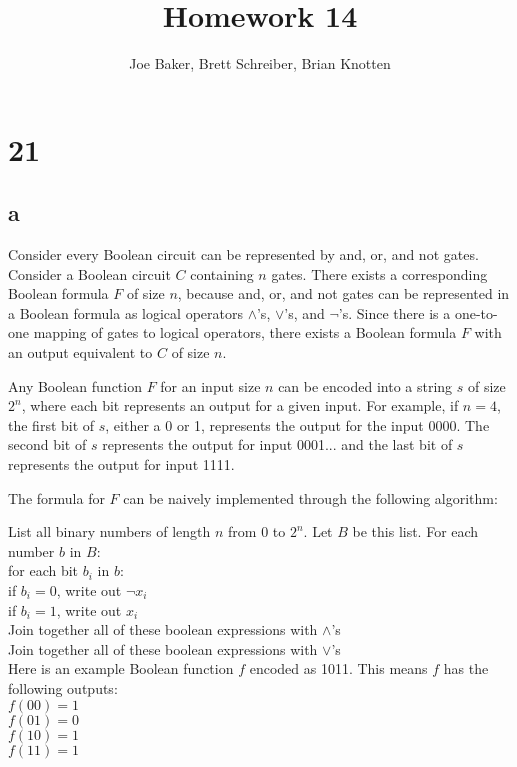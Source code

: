 \documentclass[letterpaper,notitlepage,twoside]{article}
\newcommand\tab[1][1cm]{\hspace*{#1}} %
\begin{document}
\title{Homework 14}
\author{Joe Baker, Brett Schreiber, Brian Knotten}
\maketitle

\section*{21}

\subsection*{a}
Consider every Boolean circuit can be represented by and, or, and not gates. \\
Consider a Boolean circuit $C$ containing $n$ gates. There exists a corresponding Boolean formula $F$ of size $n$, because and, or, and not gates can be represented in a Boolean formula as logical operators $\land$'s, $\lor$'s, and $\neg$'s. Since there is a one-to-one mapping of gates to logical operators, there exists a Boolean formula $F$ with an output equivalent to $C$ of size $n$.

Any Boolean function $F$ for an input size $n$ can be encoded into a string $s$ of size $2^n$, where each bit represents an output for a given input. For example, if $n = 4$, the first bit of $s$, either a 0 or 1, represents the output for the input 0000. The second bit of $s$ represents the output for input 0001... and the last bit of $s$ represents the output for input 1111.

The formula for $F$ can be naively implemented through the following algorithm:

List all binary numbers of length $n$ from $0$ to $2^n$. Let $B$ be this list.
For each number $b$ in $B$: \\
\tab for each bit $b_i$ in $b$: \\
\tab\tab if $b_i = 0$, write out $\neg x_i$ \\
\tab\tab if $b_i = 1$, write out $x_i$ \\
\tab Join together all of these boolean expressions with $\land$'s \\
Join together all of these boolean expressions with $\lor$'s \\

Here is an example Boolean function $f$ encoded as 1011. This means $f$ has the following outputs: \\
$f(00) = 1$ \\
$f(01) = 0$ \\
$f(10) = 1$ \\
$f(11) = 1$ \\
\end{document}
